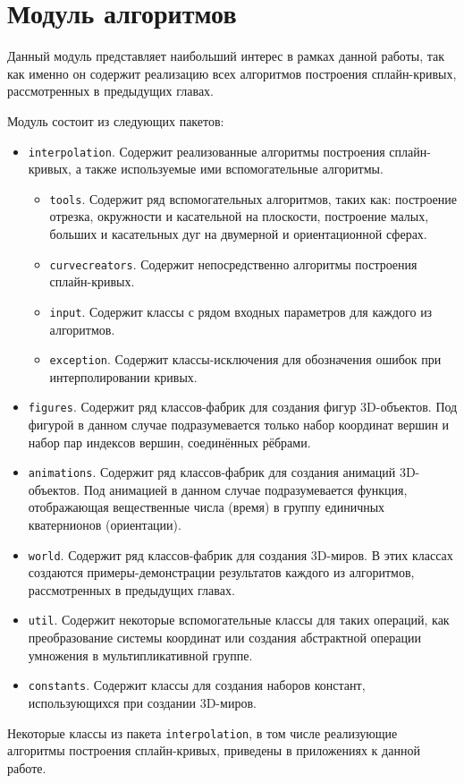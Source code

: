 \section{Модуль алгоритмов}

Данный модуль представляет наибольший интерес в рамках данной работы, так как именно он содержит реализацию всех
алгоритмов построения сплайн-кривых, рассмотренных в предыдущих главах.

Модуль состоит из следующих пакетов:

\begin{itemize}

\item \texttt{interpolation}. Содержит реализованные алгоритмы построения сплайн-кри\-вых, а также используемые ими
вспомогательные алгоритмы.
    \begin{itemize}
    \item \texttt{tools}. Содержит ряд вспомогательных алгоритмов, таких как: построение отрезка, окружности и
    касательной на плоскости, построение малых, больших и касательных дуг на двумерной и ориентационной сферах.
    \item \texttt{curvecreators}. Содержит непосредственно алгоритмы построения сплайн-кривых.
    \item \texttt{input}. Содержит классы с рядом входных параметров для каждого из алгоритмов.
    \item \texttt{exception}. Содержит классы-исключения для обозначения ошибок при интерполировании кривых.
    \end{itemize}

\item \texttt{figures}. Содержит ряд классов-фабрик для создания фигур 3D-объектов. Под фигурой в данном случае
подразумевается только набор координат вершин и набор пар индексов вершин, соединённых рёбрами.

\item \texttt{animations}. Содержит ряд классов-фабрик для создания анимаций 3D-объек\-тов. Под анимацией в данном
случае подразумевается функция, отображающая вещественные числа (время) в группу единичных кватернионов (ориентации).

\item \texttt{world}. Содержит ряд классов-фабрик для создания 3D-миров. В этих классах создаются примеры-демонстрации
результатов каждого из алгоритмов, рассмотренных в предыдущих главах.

\item \texttt{util}. Содержит некоторые вспомогательные классы для таких операций, как преобразование системы
координат или создания абстрактной операции умножения в мультипликативной группе.

\item \texttt{constants}. Содержит классы для создания наборов констант, использующихся при создании 3D-миров.

\end{itemize}

Некоторые классы из пакета \texttt{interpolation}, в том числе реализующие алгоритмы построения сплайн-кривых,
приведены в приложениях к данной работе.

